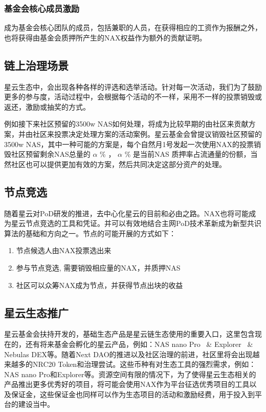 \subsubsection{基金会核心成员激励}
成为基金会核心团队的成员，包括兼职的人员，在获得相应的工资作为报酬之外，也将获得由基金会质押所产生的NAX权益作为额外的贡献证明。


\subsection{链上治理场景}
星云生态中，会出现各种各样的评选和选举活动。针对每一次活动，我们为了鼓励更多的参与度，活动过程中，会根据每个活动的不一样，采用不一样的投票销毁或返还，激励或抽奖的方式。

例如接下来社区预留的3500w NAS如何处理，将成为比较早期的由社区来贡献方案，并由社区来投票决定处理方案的活动案例。星云基金会曾提议销毁社区预留的3500w NAS，其中一种可能的方案是，每个自然月1号发起一次使用NAX的投票销毁社区预留剩余NAS总量的 \(\alpha\) \% ， \(\alpha\) \% 是当前NAS 质押率占流通量的份额，当然社区也可以提供更加有效的方案，然后共同决定这部分资产的处理。

\subsection{节点竞选}
随着星云对PoD研发的推进，去中心化星云的目前和必由之路。NAX也将可能成为星云节点竞选的工具和凭证。并可以有效地结合主网PoD技术革新成为新型共识算法的基础和方向之一。节点的可能开展的方式如下：
\begin{enumerate}[\hspace{1cm}(a)]
  \item 节点候选人由NAX投票选出来
  \item 参与节点竞选, 需要销毁相应量的NAX，并质押NAS
  \item 社区可以众筹NAX成为节点，并获得节点出块的收益
\end{enumerate}

\subsection{星云生态推广}
星云基金会扶持开发的，基础生态产品是星云链生态使用的重要入口，这里包含现在的，还有将来基金会孵化的星云产品，例如：NAS nano Pro~\cite{NASnano} \& Explorer~\cite{explorer} \& Nebulas DEX等。随着Next DAO的推进以及社区治理的前进，社区里将会出现越来越多的NRC20 Token和治理尝试。这些币种有对生态工具的强烈需求，例如：NAS nano Pro和Explorer等。资源空间有限的情况下，为了使得星云生态相关的产品推出更多优秀好的项目，将可能会使用NAX作为平台征选优秀项目的工具以及保证金，这些保证金也同样可以作为生态项目的活动和激励经费，用于投入到平台的建设当中。
